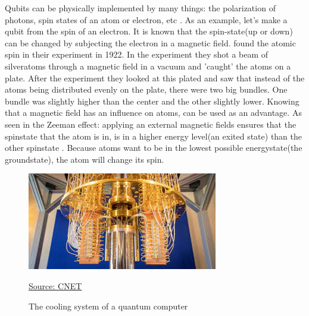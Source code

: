 Qubits can be physically implemented by many things: the polarization of photons, spin states of an atom or electron, etc \autocite{thequbit}.
As an example, let's make a qubit from the spin of an electron. It is known that the spin-state(up or down) can be changed by subjecting the electron in a magnetic field.
\textcite{Stern} found the atomic spin in their experiment in 1922. In the experiment they shot a beam of silveratoms through a magnetic field in a vacuum and 'caught' the atoms on a plate. After the experiment they looked at this plated and saw that instead of the atoms being distributed evenly on the plate, there were two big bundles.
One bundle was slightly higher than the center and the other slightly lower. Knowing that a magnetic field has an influence on atoms, can be used as an advantage. As seen in the Zeeman effect: applying an external magnetic fields ensures that the spinstate that the atom is in, is in a higher energy level(an exited state) than the other spinstate \autocite{Zeeman}.
Because atoms want to be in the lowest possible energystate(the groundstate), the atom will change its spin. 

\begin{figure} [h]
    \centering
    \includegraphics[width=\textwidth]{img/qcomputer.jpg}
        \caption{The cooling system of a quantum computer}
        \label{fig:Quantum computer cooling}
        \href{https://www.cnet.com/news/quantum-computing-research-helps-ibm-win-top-spot-in-patent-race/}{Source: CNET}
\end{figure}

